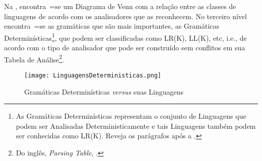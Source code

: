 Na ,
encontra~=se um Diagrama de Venn \cite{generalizedVennDiagrams} com a relação entre as classes de linguagens de acordo com os analisadores que as reconhecem.
No terceiro nível encontra~=se as gramáticas que são mais importantes,
as Gramáticas Determinísticas\footnote{
As Gramáticas Determinísticas representam o conjunto de Linguagens que podem ser Analisadas Deterministicamente e
tais Linguagens também podem ser conhecidas como LR(K).
Reveja os parágrafos após a .
},
que podem ser classificadas como LR(K),
LL(K), etc, i.e.,
de acordo com o tipo de analisador que pode ser construído sem conflitos em sua Tabela de Análise\footnote{
Do inglês, \textit{Parsing Table},
\cite{ahoCompilerDragonBook}.
}.
\begin{figure}[!htb]
\caption{Gramáticas Determinísticas \textit{versus} suas Linguagens}
\label{LinguagensDeterministicas}
\centering
\texttt{[image: LinguagensDeterministicas.png]}
\end{figure}

